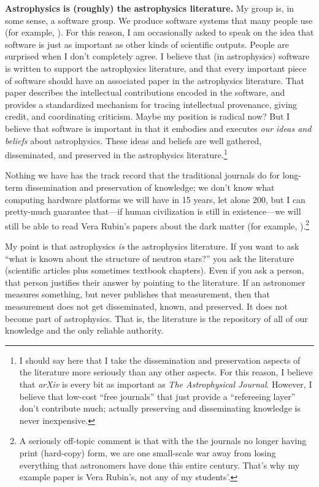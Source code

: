 \documentclass{article}
\newcommand{\paragraphskip}{\medskip}
\renewcommand{\paragraph}[1]{\par\paragraphskip\noindent\textbf{#1}}
\begin{document}
\paragraph{Astrophysics is (roughly) the astrophysics literature.}
My group is, in some sense, a software group.
We produce software systems that many people use (for example, \cite{astrometrynet, emcee}).
For this reason, I am occasionally asked to speak on the idea that software is just as important as other kinds of scientific outputs.
People are surprised when I don't completely agree.
I believe that (in astrophysics) software is written to support the astrophysics literature, and that every important piece of software should have an associated paper in the astrophysics literature.
That paper describes the intellectual contributions encoded in the software, and provides a standardized mechanism for tracing intellectual provenance, giving credit, and coordinating criticism.
Maybe my position is radical now?
But I believe that software is important in that it embodies and executes \emph{our ideas and beliefs} about astrophysics.
These ideas and beliefs are well gathered, disseminated, and preserved in the astrophysics literature.\footnote{%
I should say here that I take the dissemination and preservation aspects of the literature more seriously than any other aspects.
For this reason, I believe that \textsl{arXiv} is every bit as important as \textit{The Astrophysical Journal}.
However, I believe that low-cost ``free journals'' that just provide a ``refereeing layer'' don't contribute much;
actually preserving and disseminating knowledge is never inexpensive.}

Nothing we have has the track record that the traditional journals do for long-term dissemination and preservation of knowledge; we don't know what computing hardware platforms we will have in 15 years, let alone 200, but I can pretty-much guarantee that---if human civilization is still in existence---we will still be able to read Vera Rubin's papers about the dark matter (for example, \cite{vera}).\footnote{%
A seriously off-topic comment is that with the the journals no longer having print (hard-copy) form, we are one small-scale war away from losing everything that astronomers have done this entire century.
That's why my example paper is Vera Rubin's, not any of my students'.}

My point is that astrophysics \emph{is} the astrophysics literature.
If you want to ask ``what is known about the structure of neutron stars?'' you ask the literature (scientific articles plus sometimes textbook chapters).
Even if you ask a person, that person justifies their answer by pointing to the literature.
If an astronomer measures something, but never publishes that measurement, then that measurement does not get disseminated, known, and preserved.
It does not become part of astrophysics.
That is, the literature is the repository of all of our knowledge and the only reliable authority.
\end{document}
